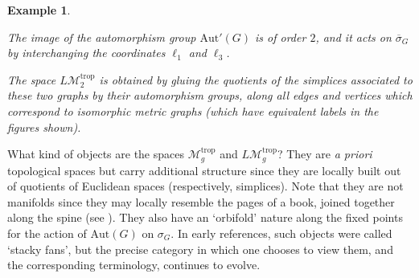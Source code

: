 \documentclass[12pt]{amsart}
\theoremstyle{plain}
\newtheorem{ex}[thm]{Example}
\newcommand{\LM}{L\mathcal{M}}
\newcommand{\trop}{\mathrm{trop}}
\newcommand{\0}{\color{blue}{\mathsf{0}}}
\begin{document}
\begin{ex}
\begin{figure}[h!]
  
\end{figure}
The image of the automorphism group  $\mathrm{Aut}'(G)$  is of order $2$, and it acts on $\overline{\sigma}_{G}$ by interchanging the coordinates $\ell_1$ and $\ell_3$.  



The space $\LM_2^{\trop}$ is obtained by gluing the quotients of the simplices associated to these two graphs by their automorphism groups, along all edges and vertices which correspond to isomorphic metric graphs (which have equivalent labels in the figures shown). 
\end{ex} 
What kind of  objects are the spaces $\mathcal{M}_g^{\trop}$ and $\LM_g^{\trop}$?  They are \emph{a priori}  topological spaces but carry additional structure since they are locally built out of quotients of Euclidean spaces (respectively,  simplices).  Note that they  are not   manifolds since they may locally  resemble the pages of a book,  joined  together along the spine (see \cite{WhatIsOuterSpace}). They also have an `orbifold' nature along the fixed points for the action of  $\mathrm{Aut}(G)$ on $\sigma_G$.  In early references, such objects were called `stacky fans', but  the precise category in which one chooses to view them, and the corresponding terminology, continues to evolve.
 
\end{document}
